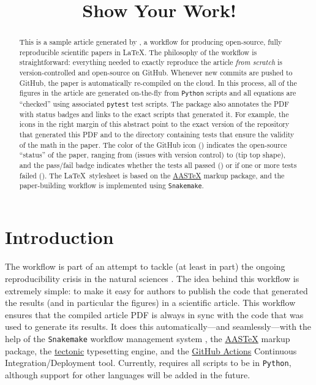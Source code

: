 \documentclass[modern]{aastex62}
\begin{document}
\title{Show Your Work!}

\author[\myORCID]{\myName}
\email{\myEmail}
\affil{\myAffil}

\begin{abstract}
    This is a sample article generated by \showyourwork, a workflow for producing open-source, fully reproducible scientific papers in \LaTeX.
    The philosophy of the workflow is straightforward: everything needed to exactly reproduce the article \emph{from scratch} is version-controlled and open-source on GitHub.
    Whenever new commits are pushed to GitHub, the paper is automatically re-compiled on the cloud.
    In this process, all of the figures in the article are generated on-the-fly from \texttt{Python} scripts and all equations are ``checked'' using associated \texttt{pytest} test scripts.
    The \showyourwork package also annotates the PDF with status badges and links to the exact scripts that generated it.
    For example, the icons in the right margin of this abstract point to the exact version of the repository that generated this PDF and to the directory containing tests that ensure the validity of the math in the paper.
    The color of the GitHub icon (\GitHubIcon) indicates the open-source ``status'' of the paper, ranging from \GitHubIconRed (issues with version control) to \GitHubIconBlue (tip top shape), and the pass/fail badge indicates whether the tests all passed (\TestPassIcon) or if one or more tests failed (\TestFailIcon).
    The \LaTeX\, stylesheet is based on the \href{https://journals.aas.org/aastex-package-for-manuscript-preparation/}{AASTeX} markup package, and the paper-building workflow is implemented using \texttt{Snakemake}.
\end{abstract}

\section{Introduction}

The \showyourwork workflow is part of an attempt to tackle (at least in part) the ongoing reproducibility crisis in the natural sciences \citep[see, e.g.,][]{Baker2016}.
The idea behind this workflow is extremely simple: to make it easy for authors to publish the code that generated the results (and in particular the figures) in a scientific article.
This workflow ensures that the compiled article PDF is always in sync with the code that was used to generate its results.
It does this automatically---and seamlessly---with the help of the \texttt{Snakemake} workflow management system \citep{Molder2021}, the \href{https://journals.aas.org/aastex-package-for-manuscript-preparation/}{AASTeX} markup package, the \href{https://github.com/tectonic-typesetting/tectonic}{tectonic} typesetting engine, and the \href{https://github.com/features/actions}{GitHub Actions} Continuous Integration/Deployment tool. Currently, \showyourwork requires all scripts to be in \texttt{Python}, although support for other languages will be added in the future.
\end{document}
